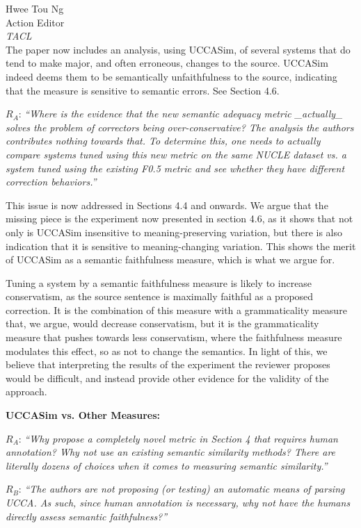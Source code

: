 \documentclass[11pt,letterpaper]{letter}
\begin{document}
\begin{letter}{%
Hwee Tou Ng\\
Action Editor\\
{\em TACL}\\
}
The paper now includes an analysis, using UCCASim, of several systems that do tend to
make major, and often erroneous, changes to the source. UCCASim indeed deems them to be semantically
unfaithfulness to the source, indicating that the measure is sensitive to semantic errors. See Section 4.6.

$R_A$: \emph{``Where is the evidence that the new semantic adequacy metric \_actually\_
	solves the problem of correctors being over-conservative? The analysis the
	authors contributes nothing towards that. To determine this, one needs to
	actually compare systems tuned using this new metric on the same NUCLE
	dataset vs. a system tuned using the existing F0.5 metric and see whether
	they have different correction behaviors.''
	}

This issue is now addressed in Sections 4.4 and onwards.
We argue that the missing piece is the experiment now presented in section 4.6, as it shows that not only is UCCASim insensitive to meaning-preserving variation, but there is also indication that it is sensitive to meaning-changing variation. This shows the merit of UCCASim as a semantic faithfulness measure, which is what we argue for.

Tuning a system by a semantic faithfulness measure is likely to increase conservatism, as the source sentence is maximally faithful as a proposed correction. It is the combination of this measure with a grammaticality measure that, we argue, would decrease conservatism, but it is the grammaticality measure that pushes towards less conservatism, where the faithfulness measure modulates this effect, so as not to change the semantics. In light of this, we believe that interpreting the results of the experiment the reviewer proposes would be difficult, and instead provide other evidence for the validity of the approach.


\vspace{.5cm}
{\large\bf UCCASim vs. Other Measures:}

$R_A$: \emph{``Why propose a completely novel metric in Section 4 that requires human
	annotation? Why not use an existing semantic similarity methods? There are
	literally dozens of choices when it comes to measuring semantic similarity.''}

$R_B$: \emph{``The authors are not proposing (or
	testing) an automatic means of parsing UCCA. As such, since human annotation
	is necessary, why not have the humans directly assess semantic faithfulness?''}


\end{letter}
\end{document}
